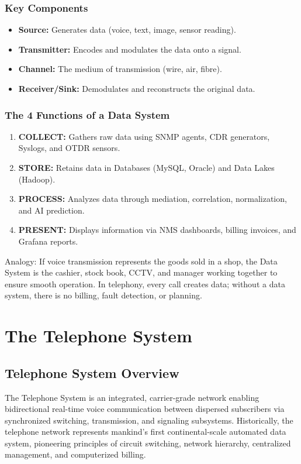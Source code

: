 \documentclass[12pt,a4paper]{report}
\begin{document}
\subsection{Key Components}
\begin{itemize}
    \item \textbf{Source:} Generates data (voice, text, image, sensor reading).
    \item \textbf{Transmitter:} Encodes and modulates the data onto a signal.
    \item \textbf{Channel:} The medium of transmission (wire, air, fibre).
    \item \textbf{Receiver/Sink:} Demodulates and reconstructs the original data.
\end{itemize}

\subsection{The 4 Functions of a Data System}
\begin{enumerate}
    \item \textbf{COLLECT:} Gathers raw data using SNMP agents, CDR generators, Syslogs, and OTDR sensors.
    \item \textbf{STORE:} Retains data in Databases (MySQL, Oracle) and Data Lakes (Hadoop).
    \item \textbf{PROCESS:} Analyzes data through mediation, correlation, normalization, and AI prediction.
    \item \textbf{PRESENT:} Displays information via NMS dashboards, billing invoices, and Grafana reports.
\end{enumerate}

Analogy: If voice transmission represents the goods sold in a shop, the Data System is the cashier, stock book, CCTV, and manager working together to ensure smooth operation. In telephony, every call creates data; without a data system, there is no billing, fault detection, or planning.

\chapter{The Telephone System}

\section{Telephone System Overview}
The Telephone System is an integrated, carrier-grade network enabling bidirectional real-time voice communication between dispersed subscribers via synchronized switching, transmission, and signaling subsystems. Historically, the telephone network represents mankind's first continental-scale automated data system, pioneering principles of circuit switching, network hierarchy, centralized management, and computerized billing.
\end{document}
